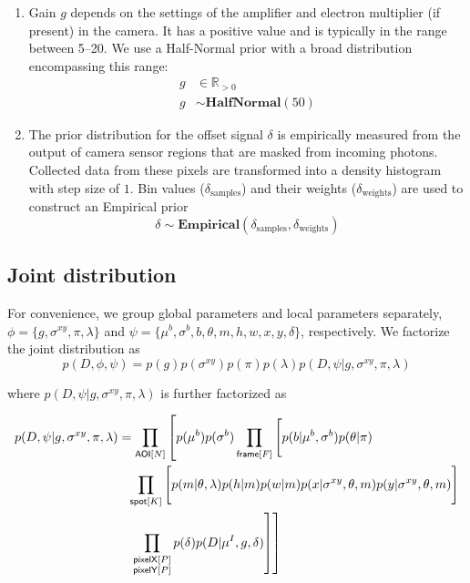 \begin{enumerate}
\item Gain $g$ depends on the settings of the amplifier and electron multiplier (if present) in the camera. It has a positive value and is typically in the range between 5--20. We use a Half-Normal prior with a broad distribution encompassing this range:
%
\begin{subequations}
\begin{align}
    g &\in \mathbb{R}_{>0} \\
    g &\sim \mathbf{HalfNormal}(50)
\end{align}
\end{subequations}

\item The prior distribution for the offset signal $\delta$ is empirically measured from the output of camera sensor regions that are masked from incoming photons. Collected data from these pixels are transformed into a density histogram with step size of $1$. Bin values ($\delta_\mathrm{samples}$) and their weights ($\delta_\mathrm{weights}$) are used to construct an Empirical prior
%
\begin{equation}
    \delta \sim \mathbf{Empirical}(\delta_\mathrm{samples}, \delta_\mathrm{weights})
\end{equation}

\end{enumerate}



\subsection*{Joint distribution}

For convenience, we group global parameters and local parameters separately, $\phi = \{ g, \sigma^{xy}, \pi, \lambda \}$ and $\psi = \{ \mu^b, \sigma^b, b, \theta, m, h, w, x, y, \delta \}$, respectively. We factorize the joint distribution as
%
\begin{equation}
    p(D, \phi, \psi) = p(g) p(\sigma^{xy}) p(\pi) p(\lambda) p(D, \psi | g, \sigma^{xy}, \pi, \lambda)
\end{equation}

\noindent
where $p(D, \psi | g, \sigma^{xy}, \pi, \lambda)$ is further factorized as

\begin{equation}
\begin{aligned}
    p(D, \psi | g, \sigma^{xy}, \pi, \lambda) &= 
    \prod_{\mathsf{AOI}[N]} \left[ p(\mu^b) p(\sigma^b) \prod_{\mathsf{frame}[F]} \left[ \vphantom{\prod_{F}} p(b | \mu^b, \sigma^b) p(\theta | \pi) \right. \right. \\
    &\phantom{=} \prod_{\mathsf{spot}[K]} \left[ \vphantom{\prod_{F}} p(m | \theta, \lambda) p(h | m) p(w | m) p(x | \sigma^{xy}, \theta, m) p(y | \sigma^{xy}, \theta, m) \right] \\
    &\phantom{=} \left. \left. \prod_{\substack{\mathsf{pixelX}[P] \\ \mathsf{pixelY}[P]}} p(\delta) p(D | \mu^I, g, \delta) \right] \right]
\end{aligned}
\end{equation}

